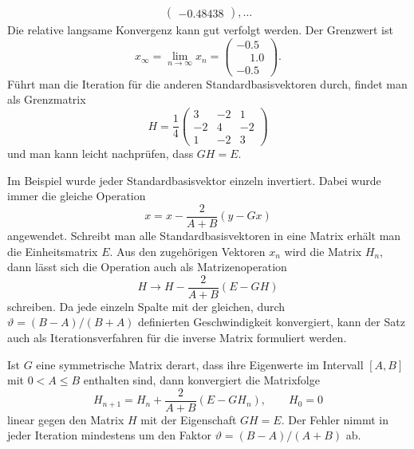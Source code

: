 \begin{beispiel}
\begin{align*}
\begin{pmatrix}
  -0.48438
\end{pmatrix},
\dots
\end{align*}
Die relative langsame Konvergenz kann gut verfolgt werden.
Der Grenzwert ist
\[
x_{\infty} = \lim_{n\to\infty}x_n = \begin{pmatrix}
-0.5\\\phantom{-}1.0\\-0.5
\end{pmatrix}.
\]
Führt man die Iteration für die anderen Standardbasisvektoren durch,
findet man als Grenzmatrix
\[
H=\frac14\begin{pmatrix}
 3&-2& 1\\
-2& 4&-2\\
 1&-2& 3
\end{pmatrix}
\]
und man kann leicht nachprüfen, dass $GH=E$.
\end{beispiel}

Im Beispiel wurde jeder Standardbasisvektor einzeln invertiert.
Dabei wurde immer die gleiche Operation
\[
x = x - \frac{2}{A+B}(y - Gx)
\]
angewendet.
Schreibt man alle Standardbasisvektoren in eine Matrix erhält man 
die Einheitsmatrix $E$. Aus den zugehörigen Vektoren $x_n$
wird die Matrix $H_n$, dann lässt sich die Operation auch als
Matrizenoperation
\[
H \to H - \frac{2}{A+B}(E - GH)
\]
schreiben.
Da jede einzeln Spalte mit der gleichen, durch $\vartheta = (B-A)/(B+A)$
definierten Geschwindigkeit konvergiert, kann der Satz auch als
Iterationsverfahren für die inverse Matrix formuliert werden.

\begin{satz}
Ist $G$ eine symmetrische Matrix derart, dass ihre Eigenwerte im
Intervall $[A,B]$ mit $0<A\le B$ enthalten sind, dann konvergiert
die Matrixfolge
\[
H_{n+1}
=
H_n
+
\frac{2}{A+B}
(
E-
GH_n
)
,
\qquad
H_0=0
\]
linear gegen den Matrix $H$ mit der Eigenschaft $GH=E$.
Der Fehler nimmt in jeder Iteration mindestens um den Faktor
$\vartheta=(B-A)/(A+B)$ ab.
\end{satz}








